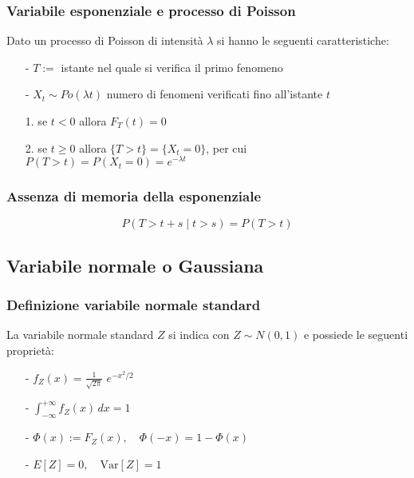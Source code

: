 \documentclass[a4paper]{article}
\newcommand\var{\text{Var}}   %
\begin{document}
\subsubsection*{Variabile esponenziale e processo di Poisson}
Dato un processo di Poisson di intensità \(\lambda\) si hanno le seguenti caratteristiche:
\begin{itemize}[topsep=3pt, itemsep=0pt]
	\item[-] \(T :=\) istante nel quale si verifica il primo fenomeno
	\item[-] \(X_t \sim Po(\lambda t)\) numero di fenomeni verificati fino all'istante \(t\)
	\item[1.] se \(t < 0\) allora \(F_T(t) = 0\)
	\item[2.] se \(t \geq 0\) allora \(\{T > t\} = \{X_t = 0\}\), per cui \(P(T > t) = P(X_t = 0) = e^{-\lambda t}\) 
\end{itemize}

\subsubsection*{Assenza di memoria della esponenziale}
\[P(T > t + s \;| \; t > s) = P(T > t)\]

\subsection{Variabile normale o Gaussiana}
\subsubsection*{Definizione variabile normale standard}
La variabile normale standard \(Z\) si indica con \(Z \sim N(0,1)\) e possiede le seguenti proprietà:
\begin{itemize}[topsep=3pt, itemsep=0pt]
	\item[-] \(\displaystyle f_Z(x) = \frac{1}{\sqrt{2 \pi}} \; e^{-x^2/2}\)
	\item[-] \(\displaystyle \int_{-\infty}^{+\infty} f_Z(x) \, dx = 1\)
	\item[-] \(\Phi(x) := F_Z(x), \quad \Phi(-x) = 1 - \Phi(x)\)
	\item[-] \(E[Z] = 0, \quad \var[Z] = 1\)
\end{itemize}
\end{document}
